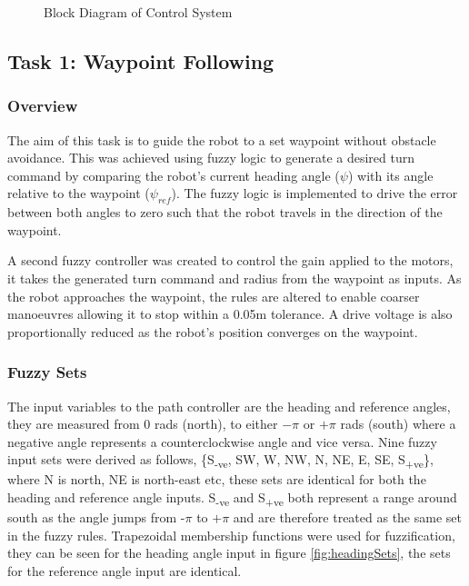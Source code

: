 \documentclass[10pt]{article}
\begin{document}
\begin{figure}[H]
    \centering
    \caption{Block Diagram of Control System}
    \label{fig:system}
\end{figure}



\subsection{Task 1: Waypoint Following}
\subsubsection{Overview}
The aim of this task is to guide the robot to a set waypoint without obstacle avoidance.
This was achieved using fuzzy logic to generate a desired turn command by comparing the robot's current heading angle ($\psi$) with its angle relative to the waypoint ($\psi_{ref}$).
The fuzzy logic is implemented to drive the error between both angles to zero such that the robot travels in the direction of the waypoint.
 
\medskip
A second fuzzy controller was created to control the gain applied to the motors, it takes the generated turn command and radius from the waypoint as inputs.
As the robot approaches the waypoint, the rules are altered to enable coarser manoeuvres allowing it to stop within a 0.05m tolerance.
A drive voltage is also proportionally reduced as the robot's position converges on the waypoint. 

\subsubsection{Fuzzy Sets}

The input variables to the path controller are the heading and reference angles, they are measured from 0 rads (north), to either $-\pi$ or $+\pi$ rads (south) where a negative angle represents a counterclockwise angle and vice versa.
Nine fuzzy input sets were derived as follows, \{S\textsubscript{-ve}, SW, W, NW, N, NE, E, SE, S\textsubscript{+ve}\}, where N is north, NE is north-east etc, these sets are identical for both the heading and reference angle inputs.
S\textsubscript{-ve} and S\textsubscript{+ve} both represent a range around south as the angle jumps from -$\pi$ to $+\pi$ and are therefore treated as the same set in the fuzzy rules. 
Trapezoidal membership functions were used for fuzzification, they can be seen for the heading angle input in figure \ref{fig:headingSets}, the sets for the reference angle input are identical.
\end{document}
